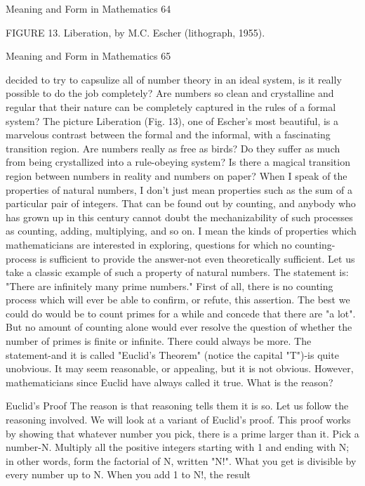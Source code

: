 Meaning and Form in Mathematics                                                          64

                FIGURE 13. Liberation, by M.C. Escher (lithograph, 1955).




Meaning and Form in Mathematics                                             65

decided to try to capsulize all of number theory in an ideal system, is it really possible to
do the job completely? Are numbers so clean and crystalline and regular that their nature
can be completely captured in the rules of a formal system? The picture Liberation (Fig.
13), one of Escher's most beautiful, is a marvelous contrast between the formal and the
informal, with a fascinating transition region. Are numbers really as free as birds? Do
they suffer as much from being crystallized into a rule-obeying system? Is there a
magical transition region between numbers in reality and numbers on paper?
        When I speak of the properties of natural numbers, I don't just mean properties
such as the sum of a particular pair of integers. That can be found out by counting, and
anybody who has grown up in this century cannot doubt the mechanizability of such
processes as counting, adding, multiplying, and so on. I mean the kinds of properties
which mathematicians are interested in exploring, questions for which no counting-
process is sufficient to provide the answer-not even theoretically sufficient. Let us take a
classic example of such a property of natural numbers. The statement is: "There are
infinitely many prime numbers." First of all, there is no counting process which will ever
be able to confirm, or refute, this assertion. The best we could do would be to count
primes for a while and concede that there are "a lot". But no amount of counting alone
would ever resolve the question of whether the number of primes is finite or infinite.
There could always be more. The statement-and it is called "Euclid's Theorem" (notice
the capital "T")-is quite unobvious. It may seem reasonable, or appealing, but it is not
obvious. However, mathematicians since Euclid have always called it true. What is the
reason?

                                         Euclid's Proof
The reason is that reasoning tells them it is so. Let us follow the reasoning involved. We
will look at a variant of Euclid's proof. This proof works by showing that whatever
number you pick, there is a prime larger than it. Pick a number-N. Multiply all the
positive integers starting with 1 and ending with N; in other words, form the factorial of
N, written "N!". What you get is divisible by every number up to N. When you add 1 to
N!, the result

